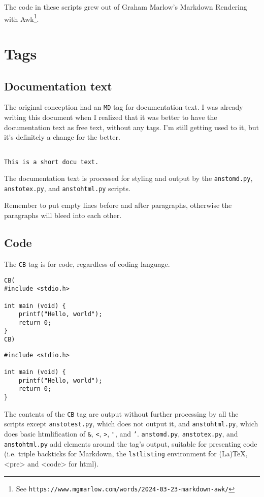 The code in these scripts grew out of Graham Marlow's Markdown Rendering with Awk\footnote{See \texttt{https://www.mgmarlow.com/words/2024-03-23-markdown-awk/}}.

\chapter{Tags}
\label{tags}

\section{Documentation text}
\label{documentation-text}

The original conception had an \texttt{MD} tag for documentation text. I was already writing this document when I realized that it was better to have the documentation text as free text, without any tags. I'm still getting used to it, but it's definitely a change for the better.

\begin{verbatim}

This is a short docu text.

\end{verbatim}

The documentation text is processed for styling and output by the \texttt{anstomd.py}, \texttt{anstotex.py}, and \texttt{anstohtml.py} scripts.

Remember to put empty lines before and after paragraphs, otherwise the paragraphs will bleed into each other.

\section{Code}
\label{code}

The \texttt{CB} tag is for code, regardless of coding language.

\begin{verbatim}
CB(
#include <stdio.h>

int main (void) {
    printf("Hello, world");
    return 0;
}
CB)
\end{verbatim}

\begin{lstlisting}
#include <stdio.h>

int main (void) {
    printf("Hello, world");
    return 0;
}
\end{lstlisting}

The contents of the \texttt{CB} tag are output without further processing by all the scripts except \texttt{anstotest.py}, which does not output it, and \texttt{anstohtml.py}, which does basic htmlification of \texttt{\&}, \texttt{<}, \texttt{>}, \texttt{"}, and \texttt{'}. \texttt{anstomd.py}, \texttt{anstotex.py}, and \texttt{anstohtml.py} add elements around the tag's output, suitable for presenting code (i.e. triple backticks for Markdown, the \texttt{lstlisting} environment for (La)TeX, <pre> and <code> for html).

